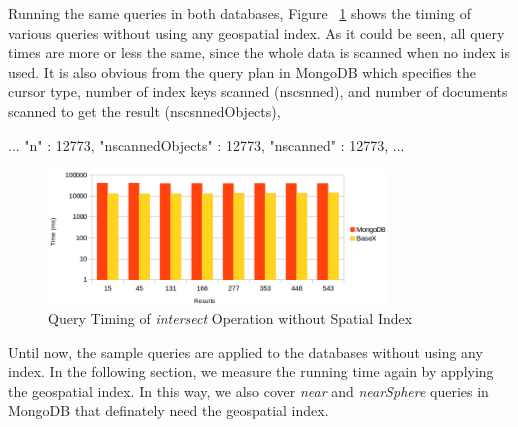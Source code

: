 \documentclass[a4paper,12pt]{article}
\begin{document}

Running the same queries in both databases, Figure ~\ref{figBXvsMongoNoIndexIntersects} shows the timing of various queries without using any geospatial index. As it could be seen, all query times are more or less the same, since the whole data is scanned when no index is used. It is also obvious from the query plan in MongoDB which specifies the cursor type, number of index keys scanned (nscsnned), and number of documents scanned to get the result (nscsnnedObjects),
\begin{fakeJSON}
...
"n" : 12773,
"nscannedObjects" : 12773,
"nscanned" : 12773,
...
\end{fakeJSON}

\begin{figure}
\centering
\includegraphics[width=0.8\textwidth,height=0.25\textheight]{BXvsMongo-NoIndex-Intersects-log}
\caption{Query Timing of \textit{intersect} Operation without Spatial Index}
\label{figBXvsMongoNoIndexIntersects}
\end{figure}


Until now, the sample queries are applied to the databases without using any index. 
In the following section, we measure the running time again by applying the geospatial index.
In this way, we also cover \textit{near} and \textit{nearSphere} queries in MongoDB that definately need the geospatial index.  
\end{document}
